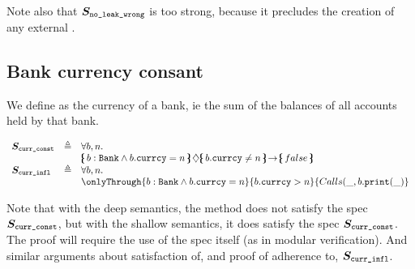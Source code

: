 \noindent
Note also that
 $\boldmath{S}_{{\texttt{no\_leak\_wrong}}} $ is too strong, because it precludes the creation of any external  .
 
 \subsection{Bank currency consant}
 
 We define as  the currency of a bank, ie the sum of the balances of all accounts held by that bank.
 
 $\begin{array}{lll}
 \Spec{curr\_const} & \triangleq &  \forall b,n.\\
 & &   \onlyIf{b:\prg{Bank}\wedge b.\prg{currcy}=n}{b.\prg{currcy}\neq n} {false}\   
 \\
  \Spec{curr\_infl} & \triangleq &  \forall b,n.\\
 & &   \onlyThrough{b:\prg{Bank}\wedge b.\prg{currcy}=n}{b.\prg{currcy}> n} {\calls{\_}{b}{\prg{print}}{\_} }   
\end{array}
$
 
 Note that with the deep semantics, the method   does not satisfy the spec $ \boldmath{S}_{{\texttt{curr\_const}}}$, but with the shallow semantics, it does satisfy the spec $ \boldmath{S}_{{\texttt{curr\_const}}}$. The proof will require the use of the spec itself (as in modular verification). And similar arguments about satisfaction of,  and proof of  adherence to, $\boldmath{S}_{{\texttt{curr\_infl}}}$.
 